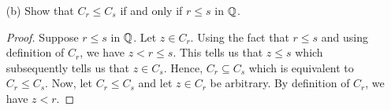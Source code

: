 \begin{enumerate}
\begin{proof}
   Now, we show the reverse inclusion. Suppose \( x \in C_{rs} \), then \( x < rs \) for \( r,s \geq 0  \) in \( \Q  \). 
        \end{proof}
    \item[(b)] Show that \( C_{r} \leq C_{s}  \) if and only if \( r \leq s  \) in \( \Q  \).
        \begin{proof}
        Suppose \( r \leq s  \) in \( \Q  \). Let \( z \in C_{r}  \). Using the fact that \( r \leq s  \) and using definition of \( C_{r}  \), we have \( z < r \leq s   \). This tells us that \( z \leq s  \) which subsequently tells us that \( z \in C_{s}   \). Hence, \( C_{r } \subseteq C_{s}  \) which is equivalent to \( C_{r} \leq C_{s} \). Now, let \( C_{r} \leq C_{s}  \) and let \( z \in C_{r} \) be arbitrary. By definition of \( C_{r}  \), we have \( z < r  \).    
        \end{proof}
\end{enumerate}

